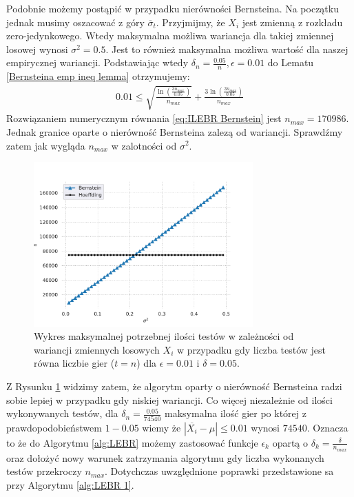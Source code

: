 \documentclass[inzynierska]{pwr_wmat_praca_dyplomowa}
\theoremstyle{plain}
\numberwithin{theorem}{chapter}
\theoremstyle{definition}
\numberwithin{theorem}{chapter}
\begin{document}
	Podobnie możemy postąpić w przypadku nierówności Bernsteina.
	Na początku jednak musimy oszacować z góry $\overline{\sigma}_t$.
	Przyjmijmy, że $X_i$ jest zmienną z rozkładu zero-jedynkowego.
	Wtedy maksymalna możliwa wariancja dla takiej zmiennej losowej wynosi $\sigma^2 = 0.5$. Jest to również maksymalna możliwa wartość dla naszej empirycznej wariancji. Podstawiając wtedy $\delta_n = \frac{0.05}{n}, \epsilon = 0.01$ do Lematu \ref{Bernsteina emp ineq lemma} otrzymujemy:
	\begin{gather}
		\label{eq:ILEBR Bernstein}
		0.01 \le \sqrt{\frac{\ln(\frac{3n_{max}}{0.05})}{n_{max}}} + \frac{3  \ln(\frac{3n_{max}}{0.05})}{n_{max}} 
	\end{gather}
	Rozwiązaniem numerycznym równania \ref{eq:ILEBR Bernstein} jest $n_{max}=170986$. Jednak granice oparte o nierówność Bernsteina zalezą od wariancji. Sprawdźmy zatem jak wygląda $n_{max}$ w zalotności od $\sigma^2$.
	\begin{figure}
		\centering
		\includegraphics[width=0.75\textwidth]{imagens/t_eq_n.pdf}
		\caption{Wykres maksymalnej potrzebnej ilości testów w zależności od wariancji zmiennych losowych  $X_i$ w przypadku gdy liczba testów jest równa liczbie gier ($t = n$) dla $\epsilon=0.01$ i $\delta = 0.05$.}
		\label{fig:t_eq_n}
	\end{figure}
	Z Rysunku \ref{fig:t_eq_n} widzimy zatem, że algorytm oparty o nierówność Bernsteina radzi sobie lepiej w przypadku gdy niskiej wariancji. Co więcej niezależnie od ilości wykonywanych testów, dla $\delta_n = \frac{0.05}{74540}$ maksymalna ilość gier po której z prawdopodobieństwem $1-0.05$ wiemy że $|\overline{X_i} - \mu| \le 0.01$ wynosi $74540$. Oznacza to że do Algorytmu \ref{alg:LEBR} możemy zastosować funkcje $\epsilon_k$ opartą o $\delta_k = \frac{\delta}{n_{max}}$ oraz dołożyć nowy warunek zatrzymania algorytmu gdy liczba wykonanych testów przekroczy $n_{max}$. Dotychczas uwzględnione poprawki przedstawione sa przy Algorytmu \ref{alg:LEBR 1}.
\end{document}
